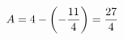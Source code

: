 \documentclass[preview]{standalone}
\begin{document}
\begin{align*}
\special{dvisvgm:raw <g id='unique000'>}A=4-\left(-\frac{11}{4}\right)=\frac{27}{4}\special{dvisvgm:raw </g>}
\end{align*}
\end{document}
